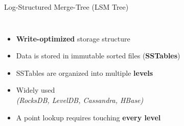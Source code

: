 \begin{frame}{Log-Structured Merge-Tree (LSM Tree)}
  \begin{columns}[T,onlytextwidth]
    \begin{itemize}
      \item \textbf{Write-optimized} storage structure
      \item Data is stored in immutable sorted files (\textbf{SSTables})
      \item SSTables are organized into multiple \textbf{levels}
      \item Widely used \\ \emph{(RocksDB, LevelDB, Cassandra, HBase)}
      \item A point lookup requires touching \textbf{every level}
    \end{itemize}

    \centering
    \LSMfiltersfalse
    \scalebox{0.95}{\LSMtree}
  \end{columns}
\end{frame}
